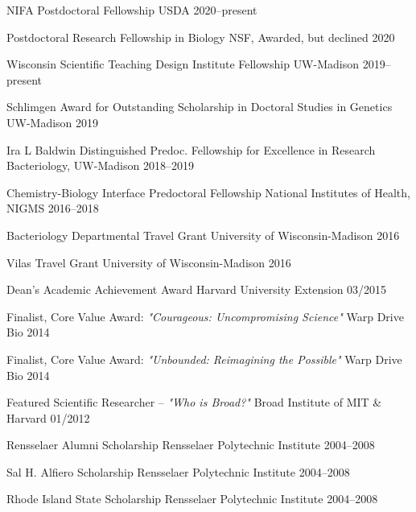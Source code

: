 \begin{cvhonors}

\cvhonor
{NIFA Postdoctoral Fellowship}
{USDA}
{2020--present}

\cvhonor
{Postdoctoral Research Fellowship in Biology}
{NSF, Awarded, but declined}
{2020}
%

\cvhonor
{Wisconsin Scientific Teaching Design Institute Fellowship}
{UW-Madison}
{2019--present}

\cvhonor
{Schlimgen Award for Outstanding Scholarship in Doctoral Studies in Genetics}
{UW-Madison}
{2019}

\cvhonor
{Ira L Baldwin Distinguished Predoc. Fellowship for Excellence in Research}
{Bacteriology, UW-Madison}
{2018--2019}

\cvhonor
{Chemistry-Biology Interface Predoctoral Fellowship}
{National Institutes of Health, NIGMS}
{2016--2018}
%
%

\cvhonor
{Bacteriology Departmental Travel Grant}
{University of Wisconsin-Madison}
{2016}

\cvhonor
{Vilas Travel Grant}
{University of Wisconsin-Madison}
{2016}

\cvhonor
{Dean's Academic Achievement Award}
{Harvard University Extension}
{03/2015}

\cvhonor
{Finalist, Core Value Award: \textit{"Courageous: Uncompromising Science"}}
{Warp Drive Bio}
{2014}

\cvhonor
{Finalist, Core Value Award: \textit{"Unbounded: Reimagining the Possible"}}
{Warp Drive Bio}
{2014}

\cvhonor
{Featured Scientific Researcher -- \textit{"Who is Broad?"}}
{Broad Institute of MIT \& Harvard}
{01/2012}

\cvhonor
{Rensselaer Alumni Scholarship}
{Rensselaer Polytechnic Institute}
{2004--2008}

\cvhonor
{Sal H. Alfiero Scholarship}
{Rensselaer Polytechnic Institute}
{2004--2008}

\cvhonor
{Rhode Island State Scholarship}
{Rensselaer Polytechnic Institute}
{2004--2008}

\end{cvhonors}
